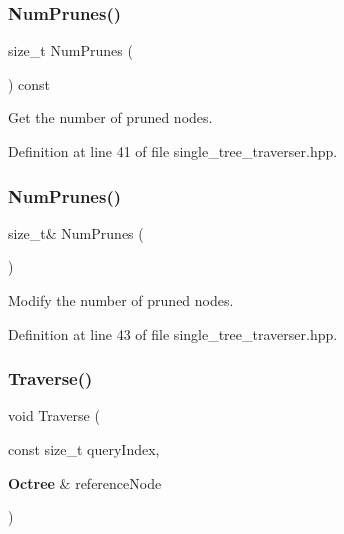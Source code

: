 \subsubsection{Num\+Prunes()\hspace{0.1cm}{\footnotesize\ttfamily [1/2]}}
{\footnotesize\ttfamily size\+\_\+t Num\+Prunes (\begin{DoxyParamCaption}{ }\end{DoxyParamCaption}) const\hspace{0.3cm}{\ttfamily [inline]}}



Get the number of pruned nodes. 



Definition at line 41 of file single\+\_\+tree\+\_\+traverser.\+hpp.

\mbox{\label{classmlpack_1_1tree_1_1Octree_1_1SingleTreeTraverser_adf887190e9d9024ff244503e4aaf0732}} 
\subsubsection{Num\+Prunes()\hspace{0.1cm}{\footnotesize\ttfamily [2/2]}}
{\footnotesize\ttfamily size\+\_\+t\& Num\+Prunes (\begin{DoxyParamCaption}{ }\end{DoxyParamCaption})\hspace{0.3cm}{\ttfamily [inline]}}



Modify the number of pruned nodes. 



Definition at line 43 of file single\+\_\+tree\+\_\+traverser.\+hpp.

\mbox{\label{classmlpack_1_1tree_1_1Octree_1_1SingleTreeTraverser_aa2a8f85a3f9dcd3e80db32f1ffb44766}} 
\subsubsection{Traverse()}
{\footnotesize\ttfamily void Traverse (\begin{DoxyParamCaption}\item[{const size\+\_\+t}]{query\+Index,  }\item[{\textbf{ Octree} \&}]{reference\+Node }\end{DoxyParamCaption})}




